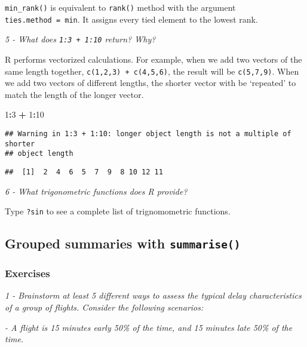 \documentclass[]{article}
\newenvironment{Shaded}{\begin{snugshade}}{\end{snugshade}}
\newcommand{\DecValTok}[1]{\textcolor[rgb]{0.00,0.00,0.81}{#1}}
\newcommand{\StringTok}[1]{\textcolor[rgb]{0.31,0.60,0.02}{#1}}
\newcommand{\OperatorTok}[1]{\textcolor[rgb]{0.81,0.36,0.00}{\textbf{#1}}}
\theoremstyle{definition}
\theoremstyle{definition}
\theoremstyle{definition}
\theoremstyle{remark}
\begin{document}
\texttt{min\_rank()} is equivalent to \texttt{rank()} method with the
argument \texttt{ties.method\ =\ \textquotesingle{}min}. It assigns
every tied element to the lowest rank.

\emph{5 - What does \texttt{1:3\ +\ 1:10} return? Why?}

R performs vectorized calculations. For example, when we add two vectors
of the same length together, \texttt{c(1,2,3)\ +\ c(4,5,6)}, the result
will be \texttt{c(5,7,9)}. When we add two vectors of different lengths,
the shorter vector with be `repeated' to match the length of the longer
vector.

\begin{Shaded}
\begin{Highlighting}[]
\DecValTok{1}\OperatorTok{:}\DecValTok{3} \OperatorTok{+}\StringTok{ }\DecValTok{1}\OperatorTok{:}\DecValTok{10}
\end{Highlighting}
\end{Shaded}

\begin{verbatim}
## Warning in 1:3 + 1:10: longer object length is not a multiple of shorter
## object length
\end{verbatim}

\begin{verbatim}
##  [1]  2  4  6  5  7  9  8 10 12 11
\end{verbatim}

\emph{6 - What trigonometric functions does R provide?}

Type \texttt{?sin} to see a complete list of trignomometric functions.

\subsection{\texorpdfstring{Grouped summaries with
\texttt{summarise()}}{Grouped summaries with summarise()}}\label{grouped-summaries-with-summarise}

\subsubsection{Exercises}\label{exercises-11}

\emph{1 - Brainstorm at least 5 different ways to assess the typical
delay characteristics of a group of flights. Consider the following
scenarios:}

\emph{- A flight is 15 minutes early 50\% of the time, and 15 minutes
late 50\% of the time.}
\end{document}
